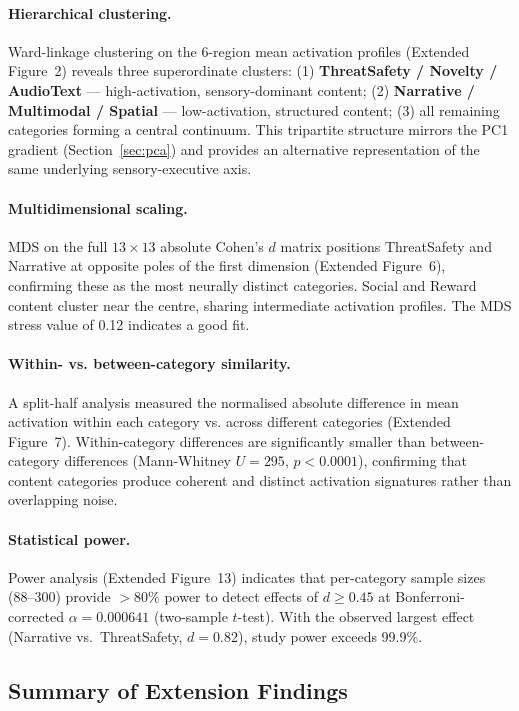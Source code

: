 \documentclass[11pt,letterpaper]{article}
\numberwithin{equation}{section}
\begin{document}
\paragraph{Hierarchical clustering.} Ward-linkage clustering on the 6-region mean activation profiles (Extended Figure~2) reveals three superordinate clusters: (1) \textbf{ThreatSafety / Novelty / AudioText} --- high-activation, sensory-dominant content; (2) \textbf{Narrative / Multimodal / Spatial} --- low-activation, structured content; (3) all remaining categories forming a central continuum. This tripartite structure mirrors the PC1 gradient (Section~\ref{sec:pca}) and provides an alternative representation of the same underlying sensory-executive axis.

\paragraph{Multidimensional scaling.} MDS on the full $13 \times 13$ absolute Cohen's $d$ matrix positions ThreatSafety and Narrative at opposite poles of the first dimension (Extended Figure~6), confirming these as the most neurally distinct categories. Social and Reward content cluster near the centre, sharing intermediate activation profiles. The MDS stress value of 0.12 indicates a good fit.

\paragraph{Within- vs. between-category similarity.} A split-half analysis measured the normalised absolute difference in mean activation within each category vs. across different categories (Extended Figure~7). Within-category differences are significantly smaller than between-category differences (Mann-Whitney $U = 295$, $p < 0.0001$), confirming that content categories produce coherent and distinct activation signatures rather than overlapping noise.

\paragraph{Statistical power.} Power analysis (Extended Figure~13) indicates that per-category sample sizes (88--300) provide $> 80\%$ power to detect effects of $d \geq 0.45$ at Bonferroni-corrected $\alpha = 0.000641$ (two-sample $t$-test). With the observed largest effect (Narrative vs.\ ThreatSafety, $d = 0.82$), study power exceeds 99.9\%.

\subsection{Summary of Extension Findings}
\end{document}
